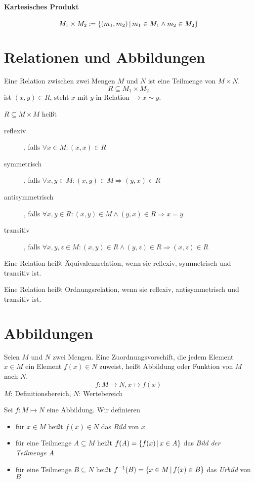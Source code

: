 \paragraph{Kartesisches Produkt}
\begin{equation*}
  M_1 \times M_2 \coloneqq \left\{ (m_1, m_2) \,\middle|\, m_1\in M_1 \wedge m_2\in M_2 \right\}
\end{equation*}

\section{Relationen und Abbildungen}
Eine Relation zwischen zwei Mengen $M$ und $N$ ist eine Teilmenge von $M\times N$.
\begin{equation*}
  R\subseteq M_1\times M_2
\end{equation*}
ist $(x, y) \in R$, steht $x$ mit $y$ in Relation $\rightarrow x\sim y$.

$R \subseteq M\times M$ heißt
\begin{description}
  \item[reflexiv], falls $\forall x\in M : (x,x)\in R$
  \item[symmetrisch], falls $\forall x,y \in M : (x,y)\in M \Rightarrow (y,x) \in R$
  \item[antisymmetrisch], falls $\forall x,y \in R : (x,y)\in M \wedge (y,x)\in R \Rightarrow x=y$
  \item[transitiv], falls $\forall x,y,z \in M : (x,y)\in R \wedge (y,z)\in R \Rightarrow (x,z)\in R$
\end{description}

Eine Relation heißt Äquivalenzrelation, wenn sie reflexiv, symmetrisch und transitiv ist.

Eine Relation heißt Ordnungsrelation, wenn sie reflexiv, antisymmetrisch und transitiv ist.

\section{Abbildungen}
Seien $M$ und $N$ zwei Mengen. Eine Zuordnungsvorschift, die jedem Element $x\in M$ ein Element $f(x)\in N$ zuweist, heißt Abbildung oder Funktion von $M$ nach $N$.
\begin{equation*}
  f:M\rightarrow N, x\mapsto f(x)
\end{equation*}
$M$: Definitionsbereich, $N$: Wertebereich

Sei $f:M\mapsto N$ eine Abbildung. Wir definieren
\begin{itemize}
  \item für $x\in M$ heißt $f(x)\in N$ das \emph{Bild} von $x$
  \item für eine Teilmenge $A\subseteq M$ heißt $f(A)=\left\{ f(x) \,\middle|\, x\in A \right\}$ das \emph{Bild der Teilmenge  $A$}
  \item für eine Teilmenge $B\subseteq N$ heißt $f^{-1}(B) = \left\{ x\in M \,\middle|\, f(x)\in B \right\}$ das \emph{Urbild} von $B$
\end{itemize}

